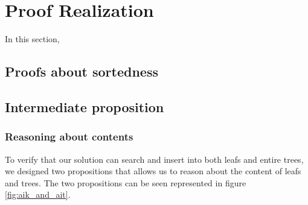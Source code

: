 \section{Proof Realization}
\label{sec:ProofRealization}
In this section, 

\subsection{Proofs about sortedness}

\subsection{Intermediate proposition}

\subsubsection{Reasoning about contents}
To verify that our solution can search and insert into both leafs and entire trees, we designed two propositions that allows us to reason about the content of leafs and trees. The two propositions can be seen represented in figure \ref{fig:aik_and_ait}. 

